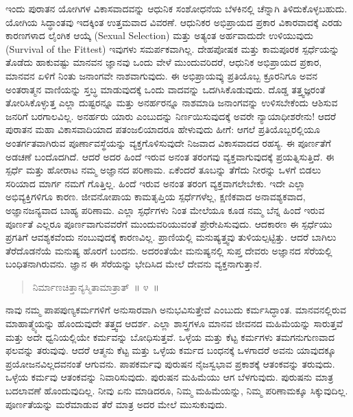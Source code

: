 ಇಂದು ಪುರಾತನ ಯೋಗಿಗಳ ವಿಕಾಸವಾದವನ್ನು ಆಧುನಿಕ ಸಂಶೋಧನೆಯ ಬೆಳಕಿನಲ್ಲಿ ಚೆನ್ನಾಗಿ ತಿಳಿದುಕೊಳ್ಳಬಹುದು. ಯೋಗಿಯ ಸಿದ್ಧಾಂತವು ಇದಕ್ಕಿಂತ ಉತ್ತಮವಾದ ವಿವರಣೆ. ಆಧುನಿಕರ ಅಭಿಪ್ರಾಯದ ಪ್ರಕಾರ ವಿಕಾರವಾದಕ್ಕೆ ಎರಡು ಕಾರಣಗಳಾದ ಲೈಂಗಿಕ ಆಯ್ಕೆ (Sexual Selection) ಮತ್ತು ಅತ್ಯಂತ ಅರ್ಹವಾದುದೇ ಉಳಿಯುವುದು (Survival of the Fittest) ಇವುಗಳು ಸಮರ್ಪಕವಾಗಿಲ್ಲ. ದೇಹಪೋಷಕ ಮತ್ತು ಕಾಮಪೂರಕ ಸ್ಪರ್ಧೆಯನ್ನು ತೊಡೆದು ಹಾಕುವಷ್ಟು ಮಾನವನ ಜ್ಞಾನವು ಒಂದು ವೇಳೆ ಮುಂದುವರಿದರೆ, ಆಧುನಿಕ ಅಭಿಪ್ರಾಯದ ಪ್ರಕಾರ, ಮಾನವನ ಏಳಿಗೆ ನಿಂತು ಜನಾಂಗವೇ ನಾಶವಾಗುವುದು. ಈ ಅಭಿಪ್ರಾಯವ್ಕು ಪ್ರತಿಯೊಬ್ಬ ಕ್ರೂರನಿಗೂ ಅವನ ಅಂತರಾತ್ಮನ ವಾಣಿಯನ್ನು ಸ್ತಬ್ಧ ಮಾಡುವುದಕ್ಕೆ ಒಂದು ವಾದವನ್ನು ಒದಗಿಸಿಕೊಡುವುದು. ದೊಡ್ಡ ತತ್ತ್ವಜ್ಞರಂತೆ ತೋರಿಸಿಕೊಳ್ಳುತ್ತ ಎಲ್ಲಾ ದುಷ್ಟರನ್ನೂ ಮತ್ತು ಅನರ್ಹರನ್ನೂ ನಾಶಮಾಡಿ ಜನಾಂಗವನ್ನು ಉಳಿಸಬೇಕೆಂದು ಆಶಿಸುವ ಜನರಿಗೆ ಬರಗಾಲವಿಲ್ಲ. ಅನರ್ಹರು ಯಾರು ಎಂಬುದನ್ನು ನಿರ್ಣಯಿಸುವುದಕ್ಕೆ ಅವರೇ ನ್ಯಾಯಾಧೀಶರೇನು! ಆದರೆ ಪುರಾತನ ಮಹಾ ವಿಕಾಸವಾದಿಯಾದ ಪತಂಜಲಿಯಾದರೂ ಹೇಳುವುದು ಹೀಗೆ: ಆಗಲೆ ಪ್ರತಿಯೊಬ್ಬರಲ್ಲಿಯೂ ಅಂತರ್ಗತವಾಗಿರುವ ಪೂರ್ಣಾವಸ್ಥೆಯನ್ನು ವ್ಯಕ್ತಗೊಳಿಸುವುದೇ ನಿಜವಾದ ವಿಕಾಸವಾದದ ರಹಸ್ಯ. ಈ ಪೂರ್ಣತೆಗೆ ಅಡಚಣೆ ಬಂದೊದಗಿದೆ. ಆದರೆ ಅದರ ಹಿಂದೆ ಇರುವ ಅನಂತ ತರಂಗವು ವ್ಯಕ್ತವಾಗುವುದಕ್ಕೆ ಪ್ರಯತ್ನಿಸುತ್ತಿದೆ. ಈ ಸ್ಪರ್ಧೆ ಮತ್ತು ಹೋರಾಟ ನಮ್ಮ ಅಜ್ಞಾನದ ಪರಿಣಾಮ. ಏಕೆಂದರೆ ತೂಬನ್ನು ತೆಗೆದು ನೀರನ್ನು ಒಳಗೆ ಬಿಡಲು ಸರಿಯಾದ ಮಾರ್ಗ ನಮಗೆ ಗೊತ್ತಿಲ್ಲ. ಹಿಂದೆ ಇರುವ ಅನಂತ ತರಂಗ ವ್ಯಕ್ತವಾಗಲೇಬೇಕು. ಇದೇ ಎಲ್ಲಾ ಅಭಿವ್ಯಕ್ತಿಗಳಿಗೂ ಕಾರಣ. ಜೀವನೋಪಾಯ ಕಾಮತೃಪ್ತಿಯ ಸ್ಪರ್ಧೆಗಳೆಲ್ಲ, ಕ್ಷಣಿಕವಾದ ಅನಾವಶ್ಯಕವಾದ, ಅಜ್ಞಾನಜನ್ಯವಾದ ಬಾಹ್ಯ ಪರಿಣಾಮ. ಎಲ್ಲಾ ಸ್ಫರ್ಧೆಗಳು ನಿಂತ ಮೇಲೆಯೂ ಕೂಡ ನಮ್ಮ ಬೆನ್ನ ಹಿಂದೆ ಇರುವ ಪೂರ್ಣತೆ ಎಲ್ಲರೂ ಪೂರ್ಣವಾಗುವವರೆಗೆ ಮುಂದುವರಿಯುವಂತೆ ಪ್ರೇರೇಪಿಸುವುದು. ಆದಕಾರಣ ಈ ಸ್ಪರ್ಧೆಯು ಪ್ರಗತಿಗೆ ಆವಶ್ಯಕವೆಂದು ನಂಬುವುದಕ್ಕೆ ಕಾರಣವಿಲ್ಲ. ಪ್ರಾಣಿಯಲ್ಲಿ ಮನುಷ್ಯತ್ತ್ವವು ತುಳಿಯಲ್ಪಟ್ಟಿತ್ತು. ಆದರೆ ಬಾಗಿಲು ತೆರೆದೊಡನೆಯೆ ಮನುಷ್ಯ ಹೊರಗೆ ಬಂದನು. ಅದರಂತೆಯೇ ಮನುಷ್ಯನಲ್ಲಿ ಸುಪ್ತ ದೇವರು ಅಜ್ಞಾನದ ಸೆರೆಯಲ್ಲಿ ಬಂಧಿತನಾಗಿರುವನು. ಜ್ಞಾನ ಈ ಸೆರೆಯನ್ನು ಭೇದಿಸಿದ ಮೇಲೆ ದೇವನು ವ್ಯಕ್ತನಾಗುತ್ತಾನೆ. 

\vspace{-0.35cm}

\begin{verse}
ನಿರ್ಮಾಣಚಿತ್ತಾನ್ಯಸ್ಮಿತಾಮಾತ್ರಾತ್​~॥ ೪~॥
\end{verse}

\vspace{-0.35cm}


\vskip 0.2cm

ನಾವು ನಮ್ಮ ಪಾಪಪುಣ್ಯಕರ್ಮಗಳಿಗೆ ಅನುಸಾರವಾಗಿ ಅನುಭವಿಸುತ್ತೇವೆ ಎಂಬುದು ಕರ್ಮಸಿದ್ಧಾಂತ. ಮಾನವನಲ್ಲಿರುವ ಮಾಹಾತ್ಮ್ಯೆಯನ್ನು ಹೊಂದುವುದೇ ತತ್ತ್ವದ ಆದರ್ಶ. ಎಲ್ಲಾ ಶಾಸ್ತ್ರಗಳೂ ಮಾನವ ಜೀವನದ ಮಹಿಮೆಯನ್ನು ಸಾರುತ್ತವೆ ಮತ್ತು ಅದೇ ಧ್ವನಿಯಲ್ಲಿಯೇ ಕರ್ಮವನ್ನು ಬೋಧಿಸುತ್ತವೆ. ಒಳ್ಳೆಯ ಮತ್ತು ಕೆಟ್ಟ ಕರ್ಮಗಳು ತಮಗನುಗುಣವಾದ ಫಲವನ್ನು ತರುವುವು. ಆದರೆ ಆತ್ಮನು ಕೆಟ್ಟ ಮತ್ತು ಒಳ್ಳೆಯ ಕರ್ಮದ ಬಂಧನಕ್ಕೆ ಒಳಗಾದರೆ ಅವನು ಯಾವುದಕ್ಕೂ ಪ್ರಯೋಜನವಿಲ್ಲದವನಂತೆ ಆಗುವನು. ಪಾಪಕರ್ಮವು ಪುರುಷನ ನೈಜಸ್ವಭಾವ ಪ್ರಕಾಶಕ್ಕೆ ಆತಂಕವನ್ನು ತರುವುದು. ಒಳ್ಳೆಯ ಕರ್ಮವು ಆತಂಕವನ್ನು ನಿವಾರಿಸುವುದು. ಪುರುಷನ ಮಹಿಮೆಯು ಆಗ ಬೆಳಗುವುದು. ಪುರುಷನು ಮಾತ್ರ ಬದಲಾವಣೆ ಹೊಂದುವುದಿಲ್ಲ. ನೀವು ಏನು ಮಾಡಿದರೂ, ನಿಮ್ಮ ಮಹಿಮೆಯನ್ನು, ನಿಮ್ಮ ಪರಿಣಾಮಕ್ಕೂ ಸಿಕ್ಕುವುದಿಲ್ಲ. ಪೂರ್ಣತೆಯನ್ನು ಮರೆಮಾಡುವ ತೆರೆ ಮಾತ್ರ ಅದರ ಮೇಲೆ ಮುಸುಕುವುದು. 

